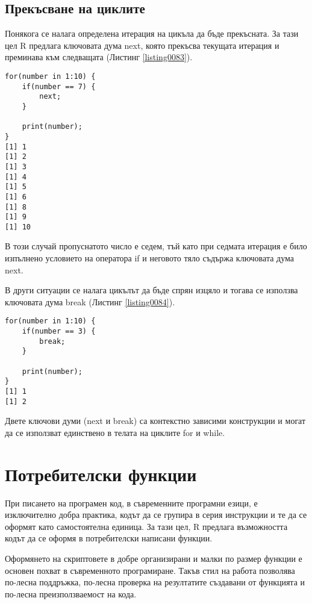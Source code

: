 \subsection{Прекъсване на циклите}

Понякога се налага определена итерация на цикъла да бъде прекъсната. За тази цел R предлага ключовата дума next, която прекъсва текущата итерация и преминава към следващата (Листинг \ref{listing0083}).

\begin{lstlisting}[caption=Прекъсване на итерация, label=listing0083]
for(number in 1:10) { 
	if(number == 7) {
		next;
	}

	print(number);
}
[1] 1
[1] 2
[1] 3
[1] 4
[1] 5
[1] 6
[1] 8
[1] 9
[1] 10
\end{lstlisting}

В този случай пропуснатото число е седем, тъй като при седмата итерация е било изпълнено условието на оператора if и неговото тяло съдържа ключовата дума next.

В други ситуации се налага цикълът да бъде спрян изцяло и тогава се използва ключовата дума break (Листинг \ref{listing0084}).

\begin{lstlisting}[caption=Прекъсване на цикъла, label=listing0084]
for(number in 1:10) { 
	if(number == 3) {
		break;
	}

	print(number);
}
[1] 1
[1] 2
\end{lstlisting}

Двете ключови думи (next и break) са контекстно зависими конструкции и могат да се използват единствено в телата на циклите for и while.

\section{Потребителски функции}

При писането на програмен код, в съвременните програмни езици, е изключително добра практика, кодът да се групира в серия инструкции и те да се оформят като самостоятелна единица. За тази цел, R предлага възможността кодът да се оформя в потребителски написани функции.

Оформянето на скриптовете в добре организирани и малки по размер функции е основен похват в съвременното програмиране. Такъв стил на работа позволява по-лесна поддръжка, по-лесна проверка на резултатите създавани от функцията и по-лесна преизползваемост на кода.

